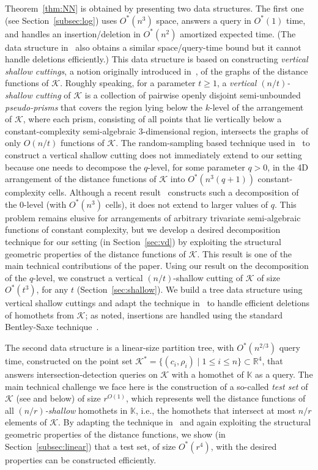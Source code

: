\documentclass[11pt]{article}
\def\reals{{\mathbb R}}
\def\Kspace{{\mathbb K}}
\def\K{\mathcal{K}}
\theoremstyle{definition}
\begin{document}
Theorem~\ref{thm:NN} is obtained by presenting two data structures. The first 
one (see Section~\ref{subsec:log})
uses $O^*(n^3)$ space, answers a query in $O^*(1)$ time, and handles an insertion/deletion in $O^*(n^2)$ amortized expected time. 
(The data structure in~\cite{AES:vd} also obtains a similar space/query-time bound but it cannot handle deletions efficiently.)
This data structure is based on constructing \emph{vertical shallow cuttings}, a notion originally introduced in~\cite{CT16,Chan:le},  of the graphs of the distance functions of $\K$. Roughly speaking,
for a parameter $t\ge 1$, a \emph{vertical $(n/t)$-shallow 
cutting} of $\K$ is a collection of pairwise openly disjoint semi-unbounded \emph{pseudo-prisms} 
that covers the region lying below the $k$-level of 
the arrangement of $\K$, where
each prism, consisting of all points that lie 
vertically below a constant-complexity semi-algebraic 
$3$-dimensional region, intersects the graphs of only $O(n/t)$ functions of $\K$.
The random-sampling based technique used in~\cite{Chan:le,KMRSS} to construct a vertical shallow cutting 
does not immediately extend to our setting because one 
needs to decompose the $q$-level, for some parameter $q>0$, in the 
4D arrangement of the distance functions of $\K$ 
into $O^*(n^3(q+1))$ constant-complexity cells. Although a recent 
result~\cite{AES:vd} constructs such a decomposition of the $0$-level (with $O^*(n^3)$ cells), it does not 
extend to larger values of $q$.
This problem remains elusive for arrangements of arbitrary trivariate semi-algebraic functions of constant complexity, 
but we develop a desired decomposition technique for our setting
(in Section~\ref{sec:vd}) by exploiting the 
structural geometric properties of the distance functions of $\K$. This result is one 
of the main technical contributions of the paper. Using our result on the decomposition of the $q$-level,
we construct a vertical $(n/t)$-shallow 
cutting of $\K$ of size $O^*(t^3)$, for any $t$ (Section~\ref{sec:shallow}). 
\iffullver
We build a tree data structure using vertical shallow cuttings
and adapt the technique in~\cite{AM95} to handle efficient deletions of 
homothets from $\K$; as noted, insertions are handled using the standard Bentley-Saxe technique~\cite{BS80}.
\fi

The second data structure is a linear-size partition tree, with $O^*(n^{2/3})$ query time,
constructed on the point set $\K^* = \{ (c_i, \rho_i) \mid 1 \le i \le n\} \subset\reals^4$,
that answers intersection-detection queries on $\K$ with a homothet of 
$\Kspace$ as a query. The main 
technical challenge we face here is the construction of a so-called \emph{test set} of $\K$ 
(see \cite{ShSh} and below) of size $r^{O(1)}$, which represents well the distance functions of all 
\emph{$(n/r)$-shallow} homothets in $\Kspace$, i.e., the homothets that intersect 
at most $n/r$ elements of $\K$. By adapting the technique in~\cite{ShSh} and again exploiting 
the structural geometric properties of the distance functions, we show 
\iffullver
(in Section~\ref{subsec:linear}) 
\fi
that a test set, of size $O^*(r^4)$, with the desired properties can be constructed efficiently.
\end{document}
